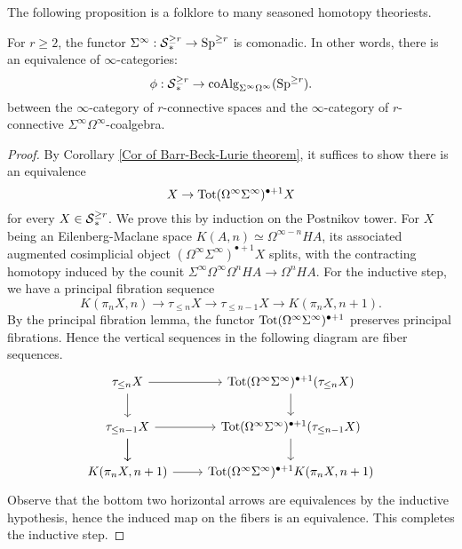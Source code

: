 	The following proposition is a folklore to many seasoned homotopy theoriests.
\begin{proposition}
	\label{Coalgebra model for simply-connected spaces}
	For $r\geq 2$, the functor $\Sigma^{\infty}:\operatorname{\mathcal{S}}^{\geq r}_{*} \to \operatorname{Sp}^{\geq r}$ is comonadic. In other words, there is an equivalence of $\infty$-categories:
	\[
	\phi: \operatorname{\mathcal{S}}^{\geq r}_{*} \to \operatorname{coAlg}_{\Sigma^{\infty}\Omega^{\infty}}(\operatorname{Sp}^{\geq r}).
	\]
 between the $\infty$-category of $r$-connective spaces and the $\infty$-category of $r$-connective $\Sigma^{\infty}\Omega^{\infty}$-coalgebra.
\end{proposition}
\begin{proof}
By Corollary \ref{Cor of Barr-Beck-Lurie theorem}, it suffices to show there is an equivalence 
$$
X\to \operatorname{Tot} (\Omega^{\infty}\Sigma^{\infty})^{\bullet+1}X
$$
for every $X\in \operatorname{\mathcal{S}}_{*}^{\geq r}$. We prove this by induction on the Postnikov tower. For $X$ being an Eilenberg-Maclane space $K(A,n)\simeq \Omega^{\infty-n}HA$, its associated augmented cosimplicial object $(\Omega^{\infty}\Sigma^{\infty})^{\bullet+1}X$ splits, with the contracting homotopy induced by the counit $\Sigma^{\infty}\Omega^{\infty} \Omega^n HA\to \Omega^n HA$. For the inductive step, we have a principal fibration sequence
\[
K(\pi_n X,n) \to \tau_{\leq n}X \to \tau_{\leq n-1}X 
\to 
K(\pi_n X,n+1).
\]
By the principal fibration lemma, the functor $\operatorname{Tot} (\Omega^{\infty}\Sigma^{\infty})^{\bullet+1}$ preserves principal fibrations. Hence the vertical sequences in the following diagram are fiber sequences.
\[
\begin{tikzcd}
	\tau_{\leq n}X & \Tot (\Omega^{\infty}\Sigma^{\infty})^{\bullet+1} (\tau_{\leq n}X)\\
	\tau_{\leq n-1}X  & \Tot (\Omega^{\infty}\Sigma^{\infty})^{\bullet+1} (\tau_{\leq n-1}X)\\
	K(\pi_n X,n+1)   & \Tot (\Omega^{\infty}\Sigma^{\infty})^{\bullet+1} K(\pi_n X,n+1)
	\arrow[from=1-1, to=1-2]
	\arrow[from=1-1, to=2-1]
	\arrow[from=2-1, to=2-2]
	\arrow[from=1-2, to=2-2]
	\arrow[from=2-1, to=3-1]
	\arrow[from=3-1, to=3-2]
	\arrow[from=2-1, to=3-1]
	\arrow[from=2-2, to=3-2]
\end{tikzcd}
\]
Observe that the bottom two horizontal arrows are equivalences by the inductive hypothesis, hence the induced map on the fibers is an equivalence. This completes the inductive step.
\end{proof}


